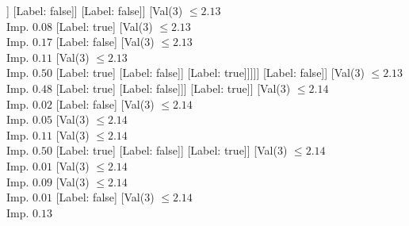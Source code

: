 \documentclass[margin=10pt]{standalone}
\begin{document}
\begin{forest}
																				[Val($3$) $ \leq 2.13$ \\ Imp. $0.01$
																					[Val($3$) $ \leq 2.13$ \\ Imp. $0.02$
																						[Val($3$) $ \leq 2.13$ \\ Imp. $0.05$
																							[Val($3$) $ \leq 2.13$ \\ Imp. $0.03$
																								[Val($3$) $ \leq 2.13$ \\ Imp. $0.03$
																									[Val($3$) $ \leq 2.13$ \\ Imp. $0.09$
																										[Label: true]
																										[Label: false]]
																									[Label: false]]
																								[Label: false]]
																							[Val($3$) $ \leq 2.13$ \\ Imp. $0.08$
																								[Label: true]
																								[Val($3$) $ \leq 2.13$ \\ Imp. $0.17$
																									[Label: false]
																									[Val($3$) $ \leq 2.13$ \\ Imp. $0.11$
																										[Val($3$) $ \leq 2.13$ \\ Imp. $0.50$
																											[Label: true]
																											[Label: false]]
																										[Label: true]]]]]
																						[Label: false]]
																					[Val($3$) $ \leq 2.13$ \\ Imp. $0.48$
																						[Label: true]
																						[Label: false]]]
																				[Label: true]]
																			[Val($3$) $ \leq 2.14$ \\ Imp. $0.02$
																				[Label: false]
																				[Val($3$) $ \leq 2.14$ \\ Imp. $0.05$
																					[Val($3$) $ \leq 2.14$ \\ Imp. $0.11$
																						[Val($3$) $ \leq 2.14$ \\ Imp. $0.50$
																							[Label: true]
																							[Label: false]]
																						[Label: true]]
																					[Val($3$) $ \leq 2.14$ \\ Imp. $0.01$
																						[Val($3$) $ \leq 2.14$ \\ Imp. $0.09$
																							[Val($3$) $ \leq 2.14$ \\ Imp. $0.01$
																								[Label: false]
																								[Val($3$) $ \leq 2.14$ \\ Imp. $0.13$

\end{forest}
\end{document}
